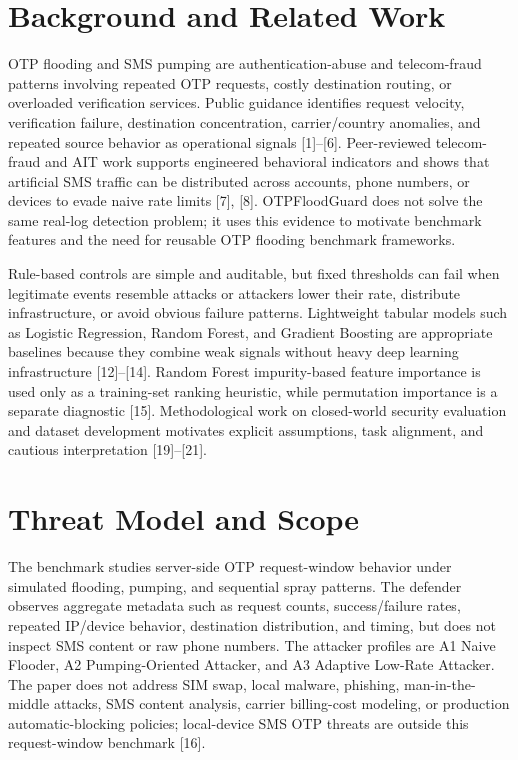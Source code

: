\documentclass[conference]{IEEEtran}
\begin{document}
\section{Background and Related Work}

OTP flooding and SMS pumping are authentication-abuse and telecom-fraud patterns involving repeated OTP requests, costly destination routing, or overloaded verification services. Public guidance identifies request velocity, verification failure, destination concentration, carrier/country anomalies, and repeated source behavior as operational signals [1]--[6]. Peer-reviewed telecom-fraud and AIT work supports engineered behavioral indicators and shows that artificial SMS traffic can be distributed across accounts, phone numbers, or devices to evade naive rate limits [7], [8]. OTPFloodGuard does not solve the same real-log detection problem; it uses this evidence to motivate benchmark features and the need for reusable OTP flooding benchmark frameworks.

Rule-based controls are simple and auditable, but fixed thresholds can fail when legitimate events resemble attacks or attackers lower their rate, distribute infrastructure, or avoid obvious failure patterns. Lightweight tabular models such as Logistic Regression, Random Forest, and Gradient Boosting are appropriate baselines because they combine weak signals without heavy deep learning infrastructure [12]--[14]. Random Forest impurity-based feature importance is used only as a training-set ranking heuristic, while permutation importance is a separate diagnostic [15]. Methodological work on closed-world security evaluation and dataset development motivates explicit assumptions, task alignment, and cautious interpretation [19]--[21].

\section{Threat Model and Scope}

The benchmark studies server-side OTP request-window behavior under simulated flooding, pumping, and sequential spray patterns. The defender observes aggregate metadata such as request counts, success/failure rates, repeated IP/device behavior, destination distribution, and timing, but does not inspect SMS content or raw phone numbers. The attacker profiles are A1 Naive Flooder, A2 Pumping-Oriented Attacker, and A3 Adaptive Low-Rate Attacker. The paper does not address SIM swap, local malware, phishing, man-in-the-middle attacks, SMS content analysis, carrier billing-cost modeling, or production automatic-blocking policies; local-device SMS OTP threats are outside this request-window benchmark [16].
\end{document}
